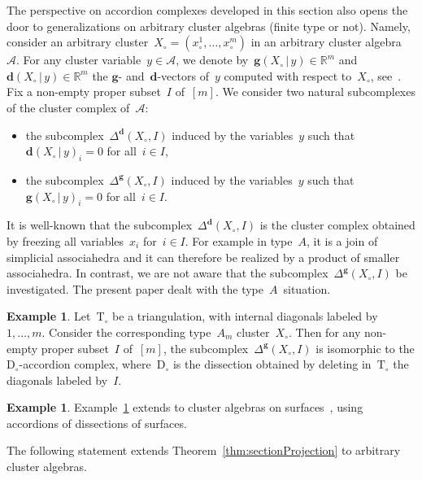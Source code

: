 \documentclass{amsart}
\theoremstyle{definition}
\newtheorem{example}[theorem]{Example}
\newcommand{\R}{\mathbb{R}} %
\newcommand{\cA}{\mathcal{A}} %
\renewcommand{\b}[1]{\mathbf{#1}} %
\newcommand{\triangulation}{\mathrm{T}} %
\newcommand{\dissection}{\mathrm{D}} %
\newcommand{\gvector}[2]{\mathbf{g}(#1 \,|\, #2)} %
\newcommand{\dvector}[2]{\mathbf{d}(#1 \,|\, #2)} %
\newcommand{\restrictedComplex}[3]{\Delta^{\b{#1}}(#2,#3)} %
\begin{document}
The perspective on accordion complexes developed in this section also opens the door to generalizations on arbitrary cluster algebras (finite type or not). Namely, consider an arbitrary cluster~$X_\circ = (x_\circ^1, \dots, x_\circ^m)$ in an arbitrary cluster algebra~$\cA$. For any cluster variable~$y \in \cA$, we denote by~$\gvector{X_\circ}{y} \in \R^m$ and~$\dvector{X_\circ}{y} \in \R^m$ the $\b{g}$- and~$\b{d}$-vectors of~$y$ computed with respect to~$X_\circ$, see~\cite{FominZelevinsky-ClusterAlgebrasI, FominZelevinsky-ClusterAlgebrasIV}. Fix a non-empty proper subset~$I$ of~$[m]$. We consider two natural subcomplexes of the cluster complex of~$\cA$:
\begin{itemize}
\item the subcomplex~$\restrictedComplex{d}{X_\circ}{I}$ induced by the variables~$y$ such that~$\dvector{X_\circ}{y}_i = 0$ for all~$i \in I$,
\item the subcomplex~$\restrictedComplex{g}{X_\circ}{I}$ induced by the variables~$y$ such that~$\gvector{X_\circ}{y}_i = 0$ for all~$i \in I$.
\end{itemize}
It is well-known that the subcomplex~$\restrictedComplex{d}{X_\circ}{I}$ is the cluster complex obtained by freezing all variables~$x_i$ for~$i \in I$. For example in type~$A$, it is a join of simplicial associahedra and it can therefore be realized by a product of smaller associahedra. In contrast, we are not aware that the subcomplex~$\restrictedComplex{g}{X_\circ}{I}$ be investigated. The present paper dealt with the type~$A$~situation.

\begin{example}
\label{exm:clusterAlgebra}
Let~$\triangulation_\circ$ be a triangulation, with internal diagonals labeled by~$1, \dots, m$. Consider the corresponding type~$A_m$ cluster~$X_\circ$. Then for any non-empty proper subset~$I$ of~$[m]$, the subcomplex~$\restrictedComplex{g}{X_\circ}{I}$ is isomorphic to the $\dissection_\circ$-accordion complex, where~$\dissection_\circ$ is the dissection obtained by deleting in~$\triangulation_\circ$ the diagonals labeled by~$I$.
\end{example}

\begin{example}
Example~\ref{exm:clusterAlgebra} extends to cluster algebras on surfaces~\cite{FominShapiroThurston, FominThurston}, using accordions of dissections of surfaces.
\end{example}

The following statement extends Theorem~\ref{thm:sectionProjection} to arbitrary cluster algebras.
\end{document}
